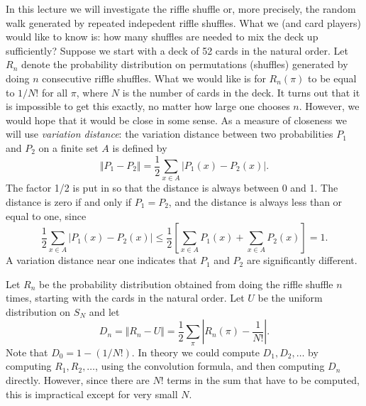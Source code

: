 \documentclass{stml-l}
\theoremstyle{definition}
\numberwithin{equation}{chapter}
\numberwithin{figure}{chapter}
\numberwithin{figure}{section}
\begin{document}
In this lecture we will investigate the riffle shuffle or, more
precisely, the random walk generated by repeated indepedent riffle
shuffles. What we (and card players) would like to know is: how many
shuffles are needed to mix the deck up sufficiently? Suppose we
start with a deck of 52 cards in the natural order. Let $R_{n}$
denote the probability distribution on permutations (shuffles)
generated by doing $n$ consecutive riffle shuffles. What we would
like is for $R_{n}(\pi)$ to be equal to $1/N!$ for all $\pi$, where
$N$ is the number of cards in the deck. It turns out that it is
impossible to get this exactly, no matter how large one chooses $n$.
However, we would hope that it would be close in some sense. As a
measure of closeness we will use \emph{variation distance}: the
variation distance between two probabilities $P_{1}$ and $P_{2}$ on
a finite set $A$ is defined by
\begin{equation*}
\Vert P_{1}-P_{2}\Vert=\frac{1}{2}\sum\limits_{x\in
A}|P_{1}(x)-P_{2}(x)|.
\end{equation*}
The factor 1/2 is put in so that the distance is always between $0$
and 1. The distance is zero if and only if $P_{1}=P_{2}$, and the
distance is always less than or equal to one, since
\begin{equation*}
\frac{1}{2}\sum\limits_{x\in
A}|P_{1}(x)-P_{2}(x)|\leq\frac{1}{2}\left[\sum\limits_{x\in
A}P_{1}(x)+\sum\limits_{x\in A}P_{2}(x)\right]=1.
\end{equation*}
A variation distance near one indicates that $P_{1}$ and $P_{2}$ are
significantly different.

Let $R_{n}$ be the probability distribution obtained from doing the
riffle shuffle $n$ times, starting with the cards in the natural
order. Let $U$ be the uniform distribution on $S_{N}$ and let
\begin{equation*}
D_{n}=\Vert
R_{n}-U\Vert=\frac{1}{2}\sum\limits_{\pi}\left|R_{n}(\pi)-\frac{1}{N!}\right|.
\end{equation*}
Note that $D_{0}=1-(1/N!)$. In theory we could compute
$D_{1},D_{2},\ldots$ by computing $R_{1},R_{2},\ldots$, using the
convolution formula, and then computing $D_{n}$ directly. However,
since there are $N!$ terms in the sum that have to be computed, this
is impractical except for very small $N$.
\end{document}
